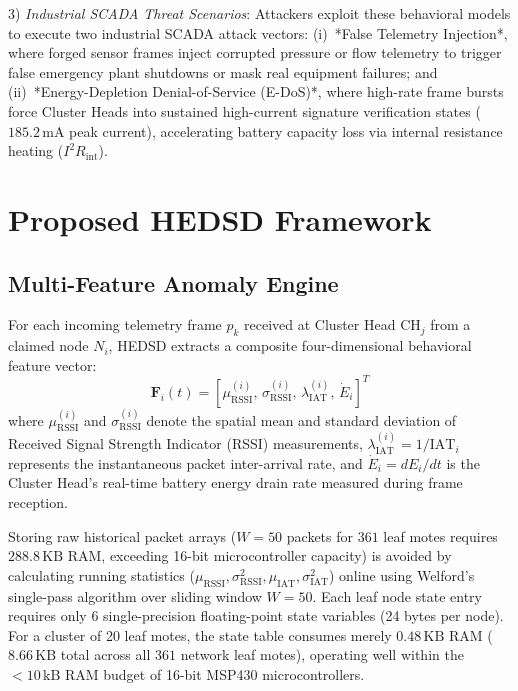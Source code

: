 \documentclass[conference]{IEEEtran}
\begin{document}
3) \textit{Industrial SCADA Threat Scenarios}: Attackers exploit these behavioral models to execute two industrial SCADA attack vectors: (i)~*False Telemetry Injection*, where forged sensor frames inject corrupted pressure or flow telemetry to trigger false emergency plant shutdowns or mask real equipment failures; and (ii)~*Energy-Depletion Denial-of-Service (E-DoS)*, where high-rate frame bursts force Cluster Heads into sustained high-current signature verification states ($185.2\,\text{mA}$ peak current), accelerating battery capacity loss via internal resistance heating ($I^2 R_\text{int}$).

\section{Proposed HEDSD Framework}
\label{sec:method}

\subsection{Multi-Feature Anomaly Engine}
For each incoming telemetry frame $p_k$ received at Cluster Head $\text{CH}_j$ from a claimed node $N_i$, HEDSD extracts a composite four-dimensional behavioral feature vector:
\begin{equation}
\mathbf{F}_i(t) = \left[ \mu_{\text{RSSI}}^{(i)}, \, \sigma_{\text{RSSI}}^{(i)}, \, \lambda_{\text{IAT}}^{(i)}, \, \dot{E}_i \right]^T
\label{eq:fingerprint}
\end{equation}
where $\mu_{\text{RSSI}}^{(i)}$ and $\sigma_{\text{RSSI}}^{(i)}$ denote the spatial mean and standard deviation of Received Signal Strength Indicator (RSSI) measurements, $\lambda_{\text{IAT}}^{(i)} = 1/\text{IAT}_i$ represents the instantaneous packet inter-arrival rate, and $\dot{E}_i = dE_i/dt$ is the Cluster Head's real-time battery energy drain rate measured during frame reception.

Storing raw historical packet arrays ($W=50$ packets for $361$ leaf motes requires $288.8\,\text{KB}$ RAM, exceeding 16-bit microcontroller capacity) is avoided by calculating running statistics ($\mu_\text{RSSI}, \sigma_\text{RSSI}^2, \mu_\text{IAT}, \sigma_\text{IAT}^2$) online using Welford's single-pass algorithm over sliding window $W=50$. Each leaf node state entry requires only 6 single-precision floating-point state variables (24 bytes per node). For a cluster of 20 leaf motes, the state table consumes merely $0.48\,\text{KB}$ RAM ($8.66\,\text{KB}$ total across all $361$ network leaf motes), operating well within the $<10\,\text{kB}$ RAM budget of 16-bit MSP430 microcontrollers.
\end{document}
